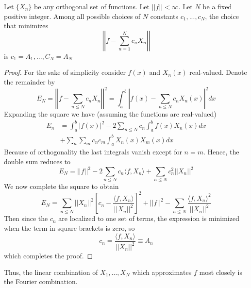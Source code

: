 \documentclass[12pt, a4paper, oneside, openright, titlepage]{book}
\begin{document}
\begin{namthm}
    Let $\{X_n\}$ be any orthogonal set of functions. Let $||f|| < \infty$. Let $N$ be a fixed positive integer. Among all possible choices of $N$ constants $c_1,...,c_N$, the choice that minimizes \begin{equation*}
        \left|\left|f-\sum_{n=1}^Nc_nX_n\right|\right|
    \end{equation*}
    is $c_1=A_1,...,C_N=A_N$
\end{namthm}
\begin{proof}
    For the sake of simplicity consider $f(x)$ and $X_n(x)$ real-valued. Denote the remainder by \begin{equation*}
        E_N = \left|\left|f - \sum_{n\leq N}c_nX_n\right|\right|^2 = \int_a^b\left|f(x) - \sum_{n\leq N}c_nX_n(x)\right|^2dx
    \end{equation*}
    Expanding the square we have (assuming the functions are real-valued) \begin{align*}
        E_n &= \int_a^b|f(x)|^2 - 2\sum_{n\leq N}c_n\int_a^bf(x)X_n(x)dx \\
        &+\sum_n\sum_mc_nc_m\int_a^bX_n(x)X_m(x)dx
    \end{align*}
    Because of orthogonality the last integrals vanish except for $n = m$. Hence, the double sum reduces to \begin{equation*}
        E_N = ||f||^2 - 2\sum_{n\leq N}c_n\langle f,X_n\rangle + \sum_{n\leq N}c_n^2||X_n||^2
    \end{equation*}
    We now complete the square to obtain \begin{equation*}
        E_N = \sum_{n\leq N}||X_n||^2\left[c_n - \frac{\langle f,X_n\rangle}{||X_n||^2}\right]^2+||f||^2 - \sum_{n\leq N}\frac{\langle f,X_n\rangle^2}{||X_n||^2}
    \end{equation*}
    Then since the $c_n$ are localized to one set of terms, the expression is minimized when the term in square brackets is zero, so \begin{equation*}
        c_n = \frac{\langle f,X_n\rangle}{||X_n||^2} \equiv A_n
    \end{equation*}
    which completes the proof.
\end{proof}

Thus, the linear combination of $X_1,...,X_N$ which approximates $f$ most closely is the Fourier combination.
\end{document}
